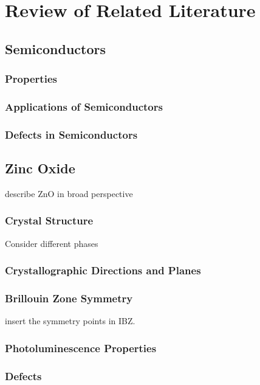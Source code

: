 \chapter{Review of Related Literature}
\section{Semiconductors}
    \subsection{Properties}
    \subsection{Applications of Semiconductors}
    \subsection{Defects in Semiconductors}
\section{Zinc Oxide}
    describe ZnO in broad perspective
    \subsection{Crystal Structure}
    Consider different phases
    \subsection{Crystallographic Directions and Planes}
    \subsection{Brillouin Zone Symmetry}
    {\color{red} insert the symmetry points in IBZ.}
    \subsection{Photoluminescence Properties}
    \subsection{Defects}

